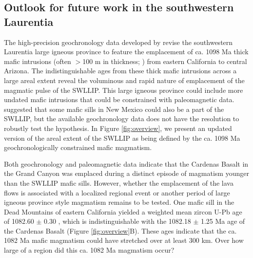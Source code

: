 \documentclass[draft]{agujournal2019}
\begin{document}
\subsection*{Outlook for future work in the southwestern Laurentia}

The high-precision geochronology data developed by  revise the southwestern Laurentia large igneous province to feature the emplacement of ca. 1098 Ma thick mafic intrusions (often $>$100 m in thickness; ) from eastern California to central Arizona. The indistinguishable ages from these thick mafic intrusions across a large areal extent reveal the voluminous and rapid nature of emplacement of the magmatic pulse of the SWLLIP. This large igneous province could include more undated mafic intrusions that could be constrained with paleomagnetic data.  suggested that some mafic sills in New Mexico could also be a part of the SWLLIP, but the available geochronology data does not have the resolution to robustly test the hypothesis. In Figure \ref{fig:overview}, we present an updated version of the areal extent of the SWLLIP as being defined by the ca. 1098 Ma geochronologically constrained mafic magmatism. 

Both geochronology and paleomagnetic data indicate that the Cardenas Basalt in the Grand Canyon was emplaced during a distinct episode of magmatism younger than the SWLLIP mafic sills. However, whether the emplacement of the lava flows is associated with a localized regional event or another period of large igneous province style magmatism remains to be tested. One mafic sill in the Dead Mountains of eastern California yielded a weighted mean zircon U-Pb age of 1082.60 $\pm$ 0.30 , which is indistinguishable with the 1082.18 $\pm$ 1.25 Ma age of the Cardenas Basalt (Figure \ref{fig:overview}B). These ages indicate that the ca. 1082 Ma mafic magmatism could have stretched over at least 300 km. Over how large of a region did this ca. 1082 Ma magmatism occur?
\end{document}
